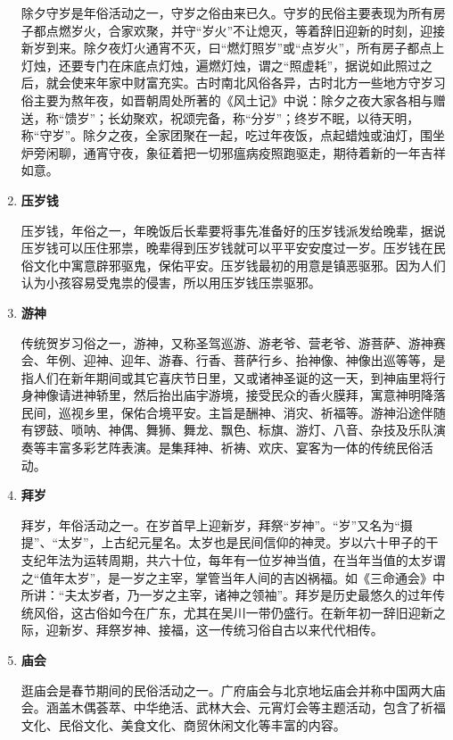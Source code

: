 \begin{enumerate}
除夕守岁是年俗活动之一，守岁之俗由来已久。守岁的民俗主要表现为所有房子都点燃岁火，合家欢聚，并守“岁火”不让熄灭，等着辞旧迎新的时刻，迎接新岁到来。除夕夜灯火通宵不灭，曰“燃灯照岁”或“点岁火”，所有房子都点上灯烛，还要专门在床底点灯烛，遍燃灯烛，谓之“照虚耗”，据说如此照过之后，就会使来年家中财富充实。古时南北风俗各异，古时北方一些地方守岁习俗主要为熬年夜，如晋朝周处所著的《风土记》中说：除夕之夜大家各相与赠送，称“馈岁”；长幼聚欢，祝颂完备，称“分岁”；终岁不眠，以待天明，称“守岁”。除夕之夜，全家团聚在一起，吃过年夜饭，点起蜡烛或油灯，围坐炉旁闲聊，通宵守夜，象征着把一切邪瘟病疫照跑驱走，期待着新的一年吉祥如意。

\item \textbf{压岁钱}

压岁钱，年俗之一，年晚饭后长辈要将事先准备好的压岁钱派发给晚辈，据说压岁钱可以压住邪祟，晚辈得到压岁钱就可以平平安安度过一岁。压岁钱在民俗文化中寓意辟邪驱鬼，保佑平安。压岁钱最初的用意是镇恶驱邪。因为人们认为小孩容易受鬼祟的侵害，所以用压岁钱压祟驱邪。

\item \textbf{游神}

传统贺岁习俗之一，游神，又称圣驾巡游、游老爷、营老爷、游菩萨、游神赛会、年例、迎神、迎年、游春、行香、菩萨行乡、抬神像、神像出巡等等，是指人们在新年期间或其它喜庆节日里，又或诸神圣诞的这一天，到神庙里将行身神像请进神轿里，然后抬出庙宇游境，接受民众的香火膜拜，寓意神明降落民间，巡视乡里，保佑合境平安。主旨是酬神、消灾、祈福等。游神沿途伴随有锣鼓、唢呐、神偶、舞狮、舞龙、飘色、标旗、游灯、八音、杂技及乐队演奏等丰富多彩艺阵表演。是集拜神、祈祷、欢庆、宴客为一体的传统民俗活动。

\item \textbf{拜岁}

拜岁，年俗活动之一。在岁首早上迎新岁，拜祭“岁神”。“岁”又名为“摄提”、“太岁”，上古纪元星名。太岁也是民间信仰的神灵。岁以六十甲子的干支纪年法为运转周期，共六十位，每年有一位岁神当值，在当年当值的太岁谓之“值年太岁”，是一岁之主宰，掌管当年人间的吉凶祸福。如《三命通会》中所讲：“夫太岁者，乃一岁之主宰，诸神之领袖”。拜岁是历史最悠久的过年传统风俗，这古俗如今在广东，尤其在吴川一带仍盛行。在新年初一辞旧迎新之际，迎新岁、拜祭岁神、接福，这一传统习俗自古以来代代相传。

\item \textbf{庙会}

逛庙会是春节期间的民俗活动之一。广府庙会与北京地坛庙会并称中国两大庙会。涵盖木偶荟萃、中华绝活、武林大会、元宵灯会等主题活动，包含了祈福文化、民俗文化、美食文化、商贸休闲文化等丰富的内容。


\end{enumerate}
